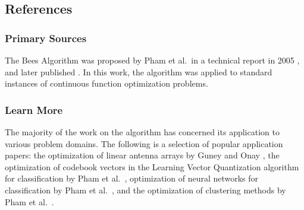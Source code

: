 

\subsection{References}

% 
% 
\subsubsection{Primary Sources}
The Bees Algorithm was proposed by Pham et al.\ in a technical report in 2005 \cite{Pham2005}, and later published \cite{Pham2006}. In this work, the algorithm was applied to standard instances of continuous function optimization problems.

% 
% 
\subsubsection{Learn More}
The majority of the work on the algorithm has concerned its application to various problem domains.
The following is a selection of popular application papers: the optimization of linear antenna arrays by Guney and Onay \cite{Guney2007}, the optimization of codebook vectors in the Learning Vector Quantization algorithm for classification by Pham et al.\ \cite{Pham2006a}, optimization of neural networks for classification by Pham et al.\ \cite{Pham2006b}, and the optimization of clustering methods by Pham et al.\ \cite{Pham2007}.


